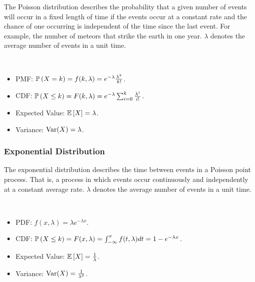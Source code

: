 \documentclass[english, course]{Notes}
\begin{document}
\begin{remark}
	The Poisson distribution describes the probability that a given number of events will occur in a fixed length of time if the events occur at a constant rate and the chance of one occurring is independent of the time since the last event. For example, the number of meteors that strike the earth in one year. $\lambda$ denotes the average number of events in a unit time.
\end{remark}

\begin{fact}\ \\
	\begin{itemize}
		\item PMF: $\mathbb{P}\left(X = k\right) = f(k, \lambda) = e^{-\lambda} \frac{\lambda^k}{k!}$.
		\item CDF: $\mathbb{P}\left(X \leq k\right) = F(k, \lambda) = e^{-\lambda} \sum_{i=0}^k \frac{\lambda^i}{i!}$.
		\item Expected Value: $\mathbb{E}\left[X\right] = \lambda$.
		\item Variance: $\operatorname{Var}(X) = \lambda$.
	\end{itemize}
\end{fact}

\subsubsection{Exponential Distribution}

\begin{remark}
	The exponential distribution describes the time between events in a Poisson point process. That is, a process in which events occur continuously and independently at a constant average rate. $\lambda$ denotes the average number of events in a unit time.
\end{remark}

\begin{fact}\ \\
	\begin{itemize}
		\item PDF: $f(x, \lambda) = \lambda e^{-\lambda x}$.
		\item CDF: $\mathbb{P}\left(X \leq k\right) = F(x, \lambda) = \int_{-\infty}^x f(t, \lambda) dt = 1 - e^{-\lambda x}$.
		\item Expected Value: $\mathbb{E}\left[X\right] = \frac{1}{\lambda}$.
		\item Variance: $\operatorname{Var}(X) = \frac{1}{\lambda^2}$.
	\end{itemize}
\end{fact}
\end{document}
